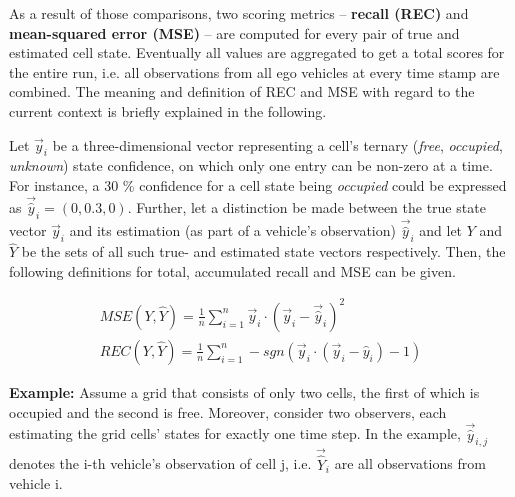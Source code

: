As a result of those comparisons, two scoring metrics – \textbf{recall (REC)} and \textbf{mean-squared error (MSE)} – are computed for every pair of true and estimated cell state. Eventually all values are aggregated to get a total scores for the entire run, i.e. all observations from all ego vehicles at every time stamp are combined. The meaning and definition of REC and MSE with regard to the current context is briefly explained in the following.
\par
\bigskip

Let $\vec{y}_i$ be a three-dimensional vector representing a cell's ternary (\textit{free}, \textit{occupied}, \textit{unknown}) state confidence, on which only one entry can be non-zero at a time. For instance, a 30 \% confidence for a cell state being \textit{occupied} could be expressed as $\vec{\hat{y}}_i = (0, 0.3, 0)$. Further, let a distinction be made between the true state vector $\vec{y}_i$ and its estimation (as part of a vehicle's observation) $\vec{\hat{y}}_i$ and let $Y$ and $\hat{Y}$ be the sets of all such true- and estimated state vectors respectively. Then, the following definitions for total, accumulated recall and MSE can be given.

\begin{gather}
	\textit{MSE}(Y, \hat{Y}) = \frac{1}{n} \sum_{i=1}^{n} \vec{y}_i \cdot (\vec{y}_i - \vec{\hat{y}}_i)^2 \\
	\textit{REC}(Y, \hat{Y}) = \frac{1}{n} \sum_{i=1}^{n} -\textit{sgn}(\vec{y}_i \cdot (\vec{y}_i - \hat{y}_i) - 1)
\end{gather}

\textbf{Example:} Assume a grid that consists of only two cells, the first of which is occupied and the second is free. Moreover, consider two observers, each estimating the grid cells' states for exactly one time step. In the example, $\vec{\hat{y}}_{i,j}$ denotes the i-th vehicle's observation of cell j, i.e. $\vec{\hat{Y}}_i$ are all observations from vehicle i.

